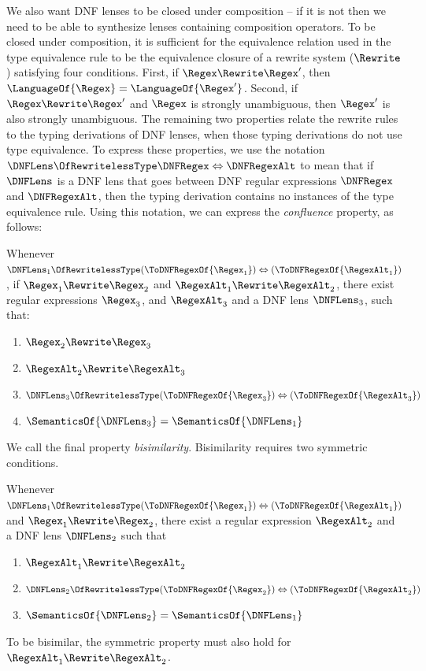 \documentclass[acmsmall,screen]{acmart}
\begin{document}
We also want DNF lenses to be closed under composition -- if it is not then we
need to be able to synthesize lenses containing composition operators.  To be
closed under composition, it is sufficient
for the equivalence relation used in the type equivalence rule
to be the equivalence closure of a rewrite system ($\Rewrite$) satisfying
four conditions.
First, if $\Regex \Rewrite \Regex'$, then $\LanguageOf{\Regex} =
\LanguageOf{\Regex'}$.
Second, if $\Regex \Rewrite \Regex'$ and $\Regex$ is strongly unambiguous, then
$\Regex'$ is also strongly unambiguous.
The remaining two properties relate the rewrite rules to the typing derivations
of DNF lenses, when those typing derivations do not use type
equivalence.
To express these properties, 
we use the notation
$\DNFLens \OfRewritelessType \DNFRegex \Leftrightarrow \DNFRegexAlt$
to mean that
if $\DNFLens$ is a DNF lens that
goes between DNF regular expressions $\DNFRegex$ and $\DNFRegexAlt$, then the
typing derivation contains no instances of the type equivalence rule.
Using this notation, we can express the \textit{confluence} property, as
follows:
% 
\begin{definition}[Confluence]
  Whenever $\DNFLens_1 \OfRewritelessType (\ToDNFRegexOf{\Regex_1}) \Leftrightarrow
  (\ToDNFRegexOf{\RegexAlt_1})$,
  if $\Regex_1 \Rewrite
  \Regex_2$ and $\RegexAlt_1 \Rewrite \RegexAlt_2$, there exist regular
  expressions $\Regex_3$, and
  $\RegexAlt_3$ and a DNF lens $\DNFLens_3$, such that:
  \begin{enumerate}
  \item $\Regex_2 \Rewrite \Regex_3$
  \item $\RegexAlt_2 \Rewrite \RegexAlt_3$
  \item $\DNFLens_3 \OfRewritelessType (\ToDNFRegexOf{\Regex_3}) \Leftrightarrow
    (\ToDNFRegexOf{\RegexAlt_3})$
  \item $\SemanticsOf{\DNFLens_3} = \SemanticsOf{\DNFLens_1}$
  \end{enumerate}
\end{definition}
%
We call the final property \textit{bisimilarity}.  Bisimilarity requires two
symmetric conditions.
%
\begin{definition}[Bisimilarity]
  Whenever $\DNFLens_1 \OfRewritelessType (\ToDNFRegexOf{\Regex_1}) \Leftrightarrow
  (\ToDNFRegexOf{\RegexAlt_1})$ and 
  $\Regex_1 \Rewrite \Regex_2$, there exist a regular expression $\RegexAlt_2$ and a
  DNF lens $\DNFLens_2$ such that
  \begin{enumerate}
  \item $\RegexAlt_1 \Rewrite \RegexAlt_2$
  \item $\DNFLens_2 \OfRewritelessType (\ToDNFRegexOf{\Regex_2}) \Leftrightarrow
    (\ToDNFRegexOf{\RegexAlt_2})$
  \item $\SemanticsOf{\DNFLens_2} = \SemanticsOf{\DNFLens_1}$
  \end{enumerate}
  To be bisimilar, the symmetric property must also hold for $\RegexAlt_1 \Rewrite
  \RegexAlt_2$.
\end{definition}
\end{document}
